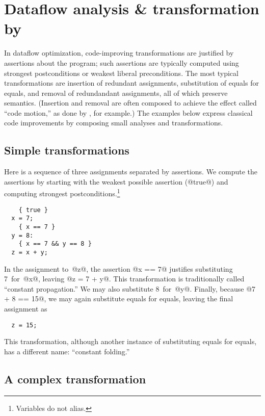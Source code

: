 \documentclass[blockstyle,preprint,nocopyrightspace]{sigplanconf}
\newcommand\seclabel[1]{\label{sec:#1}}
\begin{document}
\section{Dataflow analysis {\&} transformation by }

\seclabel{example:transforms}
\seclabel{example:xforms}

In dataflow optimization, code-improving transformations are justified
by assertions about the program;
such assertions are typically computed using
strongest postconditions or weakest liberal preconditions.
The most typical transformations are
insertion of redundant assignments,
substitution of
equals for equals, 
and
removal of redundandant assignments,
all of which preserve semantics.
(Insertion and removal are often composed to achieve the effect called
``code motion,'' as done by \citet{knoop:lazy-code-motion}, for example.) 
The examples below express classical code
improvements by composing small analyses and transformations.



\newcommand\exampletransform{\subsection}


\exampletransform{Simple transformations}

\seclabel{constant-propagation}

Here is a sequence of three assignments separated by assertions.
We compute the assertions by starting with the weakest possible
assertion (@true@) and computing strongest postconditions.\footnote
{Variables do not alias.}
\begin{verbatim}
    { true }
  x = 7;
    { x == 7 }
  y = 8: 
    { x == 7 && y == 8 }
  z = x + y;
\end{verbatim}
In the assignment to~@z@, the assertion @x == 7@ justifies
substituting 7~for~@x@, leaving @z = 7 + y@.  
This transformation is traditionally called ``constant propagation.''
We may also substitute 8~for~@y@.
Finally, because @7 + 8 == 15@, we may again substitute equals for
equals, leaving the final assignment as
\begin{verbatim}
  z = 15;
\end{verbatim}
This transformation, although another instance of substituting equals
for equals, has a different name: ``constant folding.''

\exampletransform{A complex transformation}

\seclabel{induction-var-elim}
\end{document}
